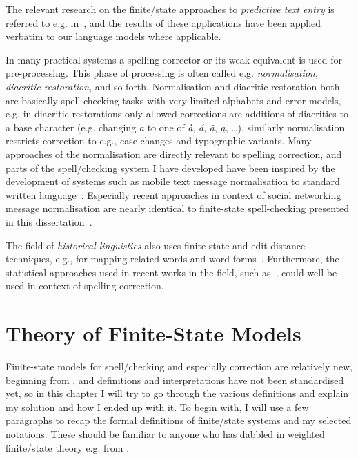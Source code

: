 \documentclass[officiallayout]{unihelcompling}
\begin{document}
The relevant research on the finite\-/state approaches to \emph{predictive text
entry} is referred to e.g. in~\citet{silfverberg2010partofspeech}, and the
results of these applications have been applied verbatim to our language models
where applicable.

In many practical systems a spelling corrector or its weak equivalent is used
for pre-processing. This phase of processing is often called e.g.
\emph{normalisation}, \emph{diacritic restoration}, and so forth. Normalisation
and diacritic restoration both are basically spell-checking tasks with very
limited alphabets and error models, e.g. in diacritic restorations only allowed
corrections are additions of diacritics to a base character (e.g. changing
\emph{a} to one of \emph{à}, \emph{á}, \emph{ã}, \emph{ą}, \ldots), similarly
normalisation restricts correction to e.g., case changes and typographic
variants.  Many approaches of the normalisation are directly relevant to
spelling correction, and parts of the spell\-/checking system I have developed
have been inspired by the development of systems such as mobile text message
normalisation to standard written language~\citep{kobus2008normalizing}.
Especially recent approaches in context of social networking message
normalisation are nearly identical to finite-state spell-checking presented in
this dissertation~\citep{hulden2013weighted}.


The field of \emph{historical linguistics} also uses finite-state and
edit-distance techniques, e.g., for mapping related words and
word-forms~\citep{porta2013edit}. Furthermore, the statistical approaches used
in recent works in the field, such as~\citet{petterson2013smt}, could well be
used in context of spelling correction. 

\section{Theory of Finite-State Models}
\label{sec:finite-state-theory}

Finite-state models for spell\-/checking and especially correction are relatively
new, beginning from \citep{oflazer1996errortolerant}, and
definitions and interpretations have not been standardised yet, so in this
chapter I will try to go through the various definitions and explain my
solution and how I ended up with it. To begin with, I will use a few paragraphs
to recap the formal definitions of finite\-/state systems and my selected
notations. These should be familiar to anyone who has dabbled in weighted
finite\-/state theory e.g. from \citet{aho2007compilers,mohri1997finitestate}.
\end{document}
